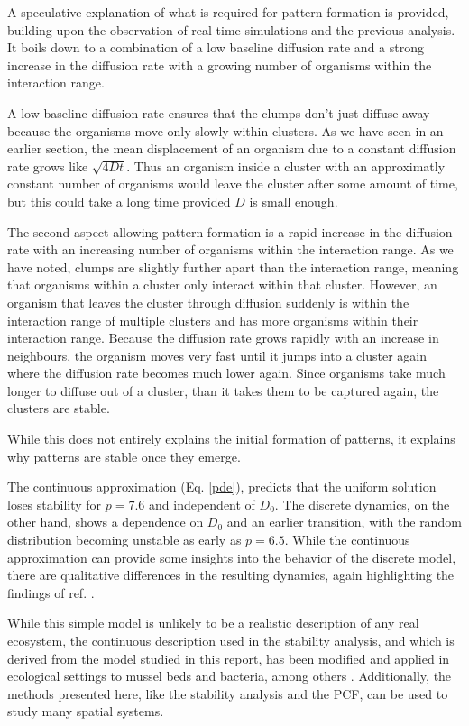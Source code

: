 \documentclass{article}
\begin{document}
A speculative explanation of what is required for pattern formation is provided, building upon the observation of real-time simulations and the previous analysis.
It boils down to a combination of a low baseline diffusion rate and a strong increase in the diffusion rate with a growing number of organisms within the interaction range.

A low baseline diffusion rate ensures that the clumps don't just diffuse away because the organisms move only slowly within clusters.
As we have seen in an earlier section, the mean displacement of an organism due to a constant diffusion rate grows like $\sqrt{4Dt}$. 
Thus an organism inside a cluster with an approximatly constant number of organisms would leave the cluster after some amount of time, but this could take a long time provided $D$ is small enough.

The second aspect allowing pattern formation is a rapid increase in the diffusion rate with an increasing number of organisms within the interaction range. 
As we have noted, clumps are slightly further apart than the interaction range, meaning that organisms within a cluster only interact within that cluster.
However, an organism that leaves the cluster through diffusion suddenly is within the interaction range of multiple clusters and has more organisms within their interaction range. 
Because the diffusion rate grows rapidly with an increase in neighbours, the organism moves very fast until it jumps into a cluster again where the diffusion rate becomes much lower again.
Since organisms take much longer to diffuse out of a cluster, than it takes them to be captured again, the clusters are stable.

While this does not entirely explains the initial formation of patterns, it explains why patterns are stable once they emerge.

The continuous approximation (Eq. \ref{pde}), predicts that the uniform solution loses stability for $p=7.6$ and independent of $D_0$. 
The discrete dynamics, on the other hand, shows a dependence on $D_0$ and an earlier transition, with the random distribution becoming unstable as early as $p=6.5$.
While the continuous approximation can provide some insights into the behavior of the discrete model, there are qualitative differences in the resulting dynamics, again highlighting the findings of ref. \autocite{durrettImportanceBeingDiscrete1994}.

While this simple model is unlikely to be a realistic description of any real ecosystem, the continuous description used in the stability analysis, and which is derived from the model studied in this report, has been modified and applied in ecological 
settings to mussel beds and bacteria, among others \autocite{liuPhaseSeparationDriven2016,liuPhaseSeparationExplains2013}.
Additionally, the methods presented here, like the stability analysis and the PCF, can be used to study many spatial systems.
\end{document}
